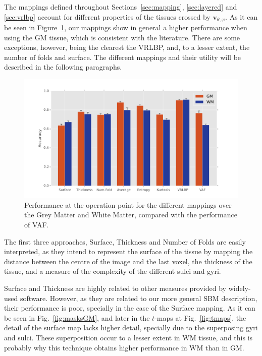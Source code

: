 The mappings defined throughout Sections~\ref{sec:mapping}, \ref{sec:layered} and \ref{sec:vrlbp} account for different properties of the tissues crossed by $\mathbf{v}_{\theta,\varphi}$. As it can be seen in Figure~\ref{fig:performance}, our mappings show in general a higher performance when using the \ac{GM} tissue, which is consistent with the literature. There are some exceptions, however, being the clearest the VRLBP, and, to a lesser extent, the number of folds and surface. The different mappings and their utility will be described in the following paragraphs. 

\begin{figure}[htp]
	\centering
	\includegraphics[width=0.9\columnwidth]{gfx/ch6/12-performance}
	\caption{Performance at the operation point for the different mappings over the Grey Matter and White Matter, compared with the performance of \ac{VAF}.}
	\label{fig:performance}
\end{figure}

The first three approaches, Surface, Thickness and Number of Folds are easily interpreted, as they intend to represent the surface of the tissue by mapping the distance between the centre of the image and the last voxel, the thickness of the tissue, and a measure of the complexity of the different sulci and gyri. 

Surface and Thickness are highly related to other measures provided by widely-used software. However, as they are related to our more general \ac{SBM} description, their performance is poor, specially in the case of the Surface mapping. As it can be seen in Fig.~\ref{fig:masksGM}, and later in the $t$-maps at Fig.~\ref{fig:tmaps}, the detail of the surface map lacks higher detail, specially due to the superposing gyri and sulci. These superposition occur to a lesser extent in \ac{WM} tissue, and this is probably why this technique obtains higher performance in \ac{WM} than in \ac{GM}. 

